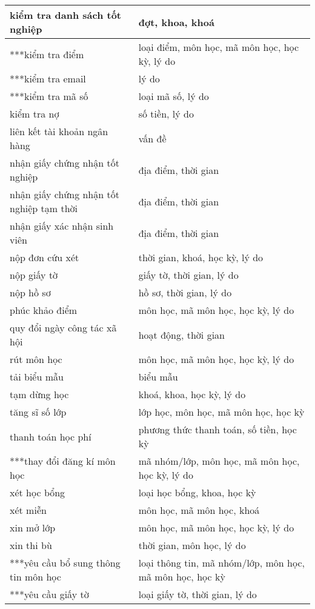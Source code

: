 \begin{table}[htbp]
\begin{tabular}{|l|l|}
        \hline
        kiểm tra danh sách tốt nghiệp & đợt, khoa, khoá \\
        \hline
        ***kiểm tra điểm & loại điểm, môn học, mã môn học, học kỳ, lý do \\
        \hline
        ***kiểm tra email & lý do \\
        \hline
        ***kiểm tra mã số & loại mã số, lý do \\
        \hline
        kiểm tra nợ & số tiền, lý do \\
        \hline
        liên kết tài khoản ngân hàng & vấn đề \\
        \hline
        nhận giấy chứng nhận tốt nghiệp & địa điểm, thời gian \\
        \hline
        nhận giấy chứng nhận tốt nghiệp tạm thời & địa điểm, thời gian \\
        \hline
        nhận giấy xác nhận sinh viên & địa điểm, thời gian \\
        \hline
        nộp đơn cứu xét & thời gian, khoá, học kỳ, lý do \\
        \hline
        nộp giấy tờ & giấy tờ, thời gian, lý do \\
        \hline
        nộp hồ sơ & hồ sơ, thời gian, lý do \\
        \hline
        phúc khảo điểm & môn học, mã môn học, học kỳ, lý do \\
        \hline
        quy đổi ngày công tác xã hội & hoạt động, thời gian \\
        \hline
        rút môn học & môn học, mã môn học, học kỳ, lý do \\
        \hline
        tải biểu mẫu & biểu mẫu \\
        \hline
        tạm dừng học & khoá, khoa, học kỳ, lý do \\
        \hline
        tăng sĩ số lớp & lớp học, môn học, mã môn học, học kỳ \\
        \hline
        thanh toán học phí & phương thức thanh toán, số tiền, học kỳ \\
        \hline
        ***thay đổi đăng kí môn học & mã nhóm/lớp, môn học, mã môn học, học kỳ, lý do \\
        \hline
        xét học bổng & loại học bổng, khoa, học kỳ \\
        \hline
        xét miễn & môn học, mã môn học, khoá \\
        \hline
        xin mở lớp & môn học, mã môn học, học kỳ, lý do \\
        \hline
        xin thi bù & thời gian, môn học, lý do \\
        \hline
        ***yêu cầu bổ sung thông tin môn học & loại thông tin, mã nhóm/lớp, môn học, mã môn học, học kỳ \\
        \hline
        ***yêu cầu giấy tờ & loại giấy tờ, thời gian, lý do \\
        \hline

    \end{tabular}
\end{table}
